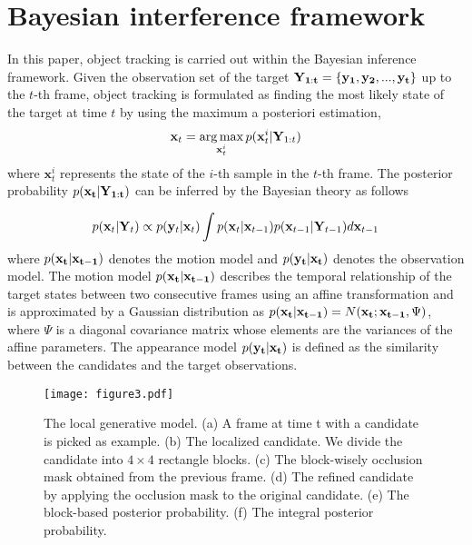 \documentclass[preprint,12pt,review]{elsarticle}
\begin{document}
\section{Bayesian interference framework}
In this paper, object tracking is carried out within the Bayesian inference framework.
%
Given the observation set of the target ${\bf{Y}_{1:t}} = \{ {\bf{y}_1},{\bf{y}_2},...,{\bf{y}_t}\}$ up to the $t$-th frame, object tracking is formulated as finding the most likely state of the target at time $t$ by using the maximum a posteriori estimation,
\begin{equation}{{\bf{x}}_t} = \mathop {\arg \max }\limits_{{\bf{x}}_t^i} p({\bf{x}}_t^i|{{\bf{Y}}_{1:t}})
\label{eq:MAP}
\end{equation}
where $\mathbf{x}_t^i$ represents the state of the $i$-th sample in the $t$-th frame.
%
The posterior probability $p({\bf{x}_t}|{\bf{Y}_{1:t}})$ can be inferred by the Bayesian theory as follows

\begin{equation}
p({{\bf{x}}_t}|{{\bf{Y}}_t}) \propto p({{\bf{y}}_t}|{{\bf{x}}_t})\int {p({{\bf{x}}_t}} |{{\bf{x}}_{t - 1}})p({{\bf{x}}_{t - 1}}|{{\bf{Y}}_{t - 1}})d{{\bf{x}}_{t - 1}}
\end{equation}
where ${p({\bf{x}_t}} |{\bf{x}_{t - 1}})$ denotes the motion model and $p({\bf{y}_t}|{\bf{x}_t})$ denotes the observation model.
%
The motion model ${p({\bf{x}_t}} |{\bf{x}_{t - 1}})$ describes the temporal relationship of the target states between two consecutive frames using an affine transformation and is approximated by a Gaussian distribution as $p({\bf{x}_t}|{\bf{x}_{t - 1}}) = N({\bf{x}_t};{\bf{x}_{t - 1}},\Psi )$, where $\Psi$ is a diagonal covariance matrix whose elements are the variances of the affine parameters.
%
The appearance model $p({\bf{y}_t}|{\bf{x}_t})$ is defined as the similarity between the candidates and the target observations.
%

\begin{figure*}[tbp]
\centering
\texttt{[image: figure3.pdf]}
\vspace{-8mm}
\caption{The local generative model. (a) A frame at time t with a candidate is picked as example. (b) The localized candidate. We divide the candidate into $4 \times 4$ rectangle blocks. (c) The block-wisely occlusion mask obtained from the previous frame. (d) The refined candidate by applying the occlusion mask to the original candidate. (e) The block-based posterior probability. (f) The integral posterior probability.}

\label{fig:generativemodel}
\end{figure*}
\end{document}
